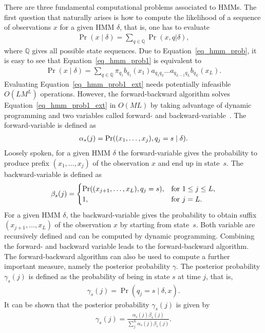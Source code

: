 There are three fundamental computational problems associated to HMMs.
The first question that naturally arises is how to compute the likelihood of a sequence of observations $x$ for a given HMM $\delta$, that is, one has to evaluate
\begin{align}
 \Pr(x \mid \delta) = \sum_{q \in \mathbb{Q}} \Pr(x, q | \delta) \label{eq_hmm_prob1}, 
\end{align}
where $\mathbb{Q}$ gives all possible state sequences.
Due to Equation~\ref{eq_hmm_prob}, it is easy to see that Equation~\ref{eq_hmm_prob1} is equivalent to
\begin{align}
 \Pr(x \mid \delta) = \sum_{q \in \mathbb{Q}}  \pi_{q_1}b_{q_1}(x_1)a_{q_1q_2} \dots a_{q_{L-1}q_L}b_{q_L}(x_L). \label{eq_hmm_prob1_ext}
\end{align}
Evaluating Equation~\ref{eq_hmm_prob1_ext} needs potentially infeasible $O(LM^L)$ operations.
However, the for\-ward-backward algorithm solves Equation~\ref{eq_hmm_prob1_ext} in $O(ML)$ by taking advantage of dynamic programming and two variables called for\-ward- and backward-variable~\citep{rabiner1989}.
The forward-variable is defined as 
\begin{align}
 \alpha_s(j) = \Pr((x_1, \ldots, x_j), q_j = s \mid \delta). \notag  %
\end{align}
Loosely spoken, for a given HMM $\delta$  the forward-variable gives the probability to produce prefix $(x_1, \ldots, x_j)$ of the observation $x$ and end up in state~$s$.
The backward-variable is defined as
\begin{align}
 \beta_s(j) = \begin{cases}
               \Pr((x_{j+1}, \ldots, x_L), q_j = s), & \text{for } 1 \leq j \leq L, \\
               1, & \text{for } j = L.
              \end{cases} \notag %
\end{align}
For a given HMM $\delta$, the backward-variable gives the probability to obtain suffix $(x_{j+1}, \ldots, x_L)$ of the observation $x$ by starting from state~$s$.
Both variable are recursively defined and can be computed by dynamic programming.
Combining the forward- and backward variable leads to the forward-backward algorithm.
The forward-backward algorithm can also be used to compute a further important measure, namely the posterior probability $\gamma$.
The posterior probability $\gamma_s(j)$ is defined as the probability of being in state $s$ at time $j$, that is,
\begin{align}
 \gamma_s(j) = \Pr(q_j = s \mid \delta, x). \label{eq_hmm_posterior}
\end{align}
It can be shown that the posterior probability $\gamma_s(j)$ is given by
\begin{align*}
 \gamma_s(j) = \frac{\alpha_s(j)\beta_s(j)}{\sum_j^L \alpha_s(j)\beta_s(j)}. \nonumber
\end{align*}

